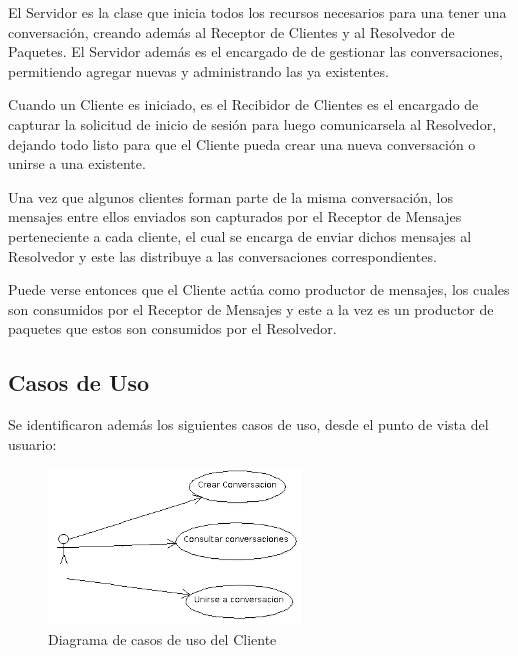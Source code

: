 \documentclass[a4paper,12pt,titlepage]{article}
\begin{document}
El Servidor es la clase que inicia todos los recursos necesarios para una tener una conversación, creando además
al Receptor de Clientes y al Resolvedor de Paquetes. El Servidor además es el encargado de de gestionar las 
conversaciones, permitiendo agregar nuevas y administrando las ya existentes.

Cuando un Cliente es iniciado, es el Recibidor de Clientes es el encargado de capturar la solicitud de inicio de sesión para luego comunicarsela al Resolvedor, 
dejando todo listo para que el Cliente pueda crear una nueva conversación o unirse a una existente.

Una vez que algunos clientes forman parte de la misma conversación, los mensajes entre ellos enviados son capturados
por el Receptor de Mensajes perteneciente a cada cliente, el cual se encarga de enviar dichos mensajes al Resolvedor y este las distribuye a las conversaciones correspondientes.

Puede verse entonces que el Cliente actúa como productor de mensajes, los cuales son consumidos por el Receptor de Mensajes y este a la vez es un productor de paquetes que estos son consumidos por el Resolvedor.\\

\subsection{Casos de Uso}
Se identificaron además los siguientes casos de uso, desde el punto de vista del usuario:\\
\begin{figure}[h!]
\centering
\includegraphics[width=0.6\textwidth]{CasosDeUso.png}
\caption{Diagrama de casos de uso del Cliente}
\label{fig:casos_uso}
\end{figure}
\end{document}
